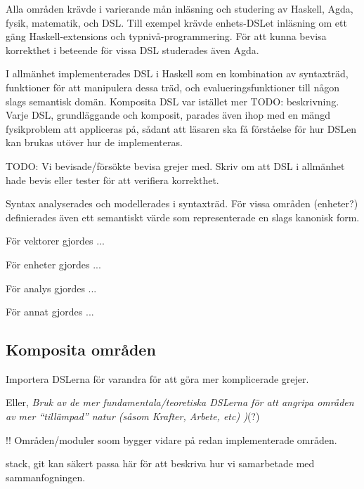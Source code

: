 \begin{binge}
\begin{draft}
    Alla områden krävde i varierande mån inläsning och studering av
    Haskell, Agda, fysik, matematik, och DSL. Till exempel krävde
    enhets-DSLet inläsning om ett gäng Haskell-extensions och
    typnivå-programmering. För att kunna bevisa korrekthet i beteende
    för vissa DSL studerades även Agda.

    I allmänhet implementerades DSL i Haskell som en kombination av
    syntaxträd, funktioner för att manipulera dessa träd, och
    evalueringsfunktioner till någon slags semantisk domän. Komposita
    DSL var istället mer TODO: beskrivning. Varje DSL, grundläggande och
    komposit, parades även ihop med en mängd fysikproblem att appliceras
    på, sådant att läsaren ska få förståelse för hur DSLen kan brukas
    utöver hur de implementeras.

    TODO: Vi bevisade/försökte bevisa grejer med. Skriv om att DSL i
    allmänhet hade bevis eller tester för att verifiera korrekthet.
  \end{draft}

  Syntax analyserades och modellerades i syntaxträd. För vissa områden
  (enheter?) definierades även ett semantiskt värde som representerade
  en slags kanonisk form.

  För vektorer gjordes ...

  För enheter gjordes ...

  För analys gjordes ...

  För annat gjordes ...

  \subsection{Komposita områden}

  Importera DSLerna för varandra för att göra mer komplicerade grejer.

  Eller, \emph{Bruk av de mer fundamentala/teoretiska DSLerna för att
    angripa områden av mer ``tillämpad'' natur (såsom Krafter, Arbete,
    etc) )}(?)

  !! Områden/moduler soom bygger vidare på redan implementerade områden.

  stack, git kan säkert passa här för att beskriva hur vi samarbetade
  med sammanfogningen.

\end{binge}


